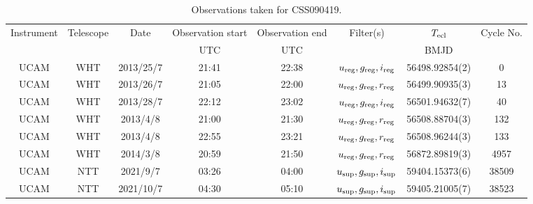 \begin{table}
	\begin{center}
		\begin{tabular}{cccccccc}
			\hline
			Instrument & Telescope & Date & Observation start & Observation end & Filter(s) & $T_{\rm ecl}$ & Cycle No. \\
			 &  &  & UTC & UTC &  & BMJD &  \\
			\hline
			\hline
			UCAM & WHT & 2013/25/7 & 21:41 & 22:38 & $u_{\rm reg},g_{\rm reg},i_{\rm reg}$ & 56498.92854(2) &    0 \\
			UCAM & WHT & 2013/26/7 & 21:05 & 22:00 & $u_{\rm reg},g_{\rm reg},r_{\rm reg}$ & 56499.90935(3) &   13 \\
			UCAM & WHT & 2013/28/7 & 22:12 & 23:02 & $u_{\rm reg},g_{\rm reg},i_{\rm reg}$ & 56501.94632(7) &   40 \\
			UCAM & WHT & 2013/4/8  & 21:00 & 21:30 & $u_{\rm reg},g_{\rm reg},r_{\rm reg}$ & 56508.88704(3) &  132 \\
			UCAM & WHT & 2013/4/8  & 22:55 & 23:21 & $u_{\rm reg},g_{\rm reg},r_{\rm reg}$ & 56508.96244(3) &  133 \\
			UCAM & WHT & 2014/3/8  & 20:59 & 21:50 & $u_{\rm reg},g_{\rm reg},r_{\rm reg}$ & 56872.89819(3) & 4957 \\
			UCAM & NTT & 2021/9/7  & 03:26 & 04:00  & $u_{\rm sup},g_{\rm sup},i_{\rm sup}$ & 59404.15373(6) & 38509 \\
			UCAM & NTT & 2021/10/7 & 04:30 & 05:10  & $u_{\rm sup},g_{\rm sup},i_{\rm sup}$ & 59405.21005(7) & 38523 \\
		   \hline
		\end{tabular}
	\end{center}
	\caption{Observations taken for CSS090419.}
	\label{table:observing:observation logs CSS090419}
\end{table}